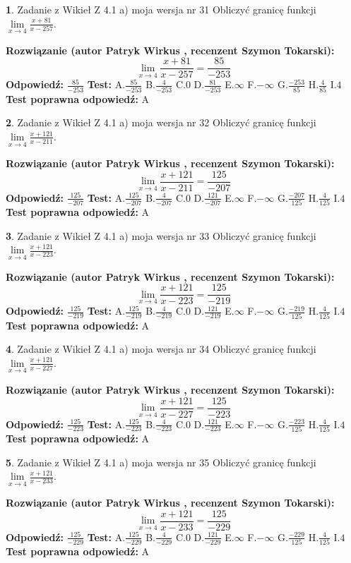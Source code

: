 \documentclass[12pt, a4paper]{article}
\theoremstyle{definition} %
\newtheorem{zad}{}
\newcommand{\zadStart}[1]{\begin{zad}#1\newline}
\newcommand{\zadStop}{\end{zad}}
\newcommand{\rozwStart}[2]{\noindent \textbf{Rozwiązanie (autor #1 , recenzent #2): }\newline}
\newcommand{\rozwStop}{\newline}
\newcommand{\odpStart}{\noindent \textbf{Odpowiedź:}\newline}
\newcommand{\odpStop}{\newline}
\newcommand{\testStart}{\noindent \textbf{Test:}\newline}
\newcommand{\testStop}{\newline}
\newcommand{\kluczStart}{\noindent \textbf{Test poprawna odpowiedź:}\newline}
\newcommand{\kluczStop}{\newline}
\begin{document}
\zadStart{Zadanie z Wikieł Z 4.1 a) moja wersja nr 31}
Obliczyć granicę funkcji $\lim\limits_{x\to4}\frac{x+81}{x-257}$.
\zadStop
\rozwStart{Patryk Wirkus}{Szymon Tokarski}
$$\lim\limits_{x\to4}\frac{x+81}{x-257} = \frac{85}{-253}$$
\rozwStop
\odpStart
$\frac{85}{-253}$
\odpStop
\testStart
A.$\frac{85}{-253}$
B.$\frac{4}{-253}$
C.$0$
D.$\frac{81}{-253}$
E.$\infty$
F.$-\infty$
G.$\frac{-253}{85}$
H.$\frac{4}{85}$
I.$4$
\testStop
\kluczStart
A
\kluczStop



\zadStart{Zadanie z Wikieł Z 4.1 a) moja wersja nr 32}
Obliczyć granicę funkcji $\lim\limits_{x\to4}\frac{x+121}{x-211}$.
\zadStop
\rozwStart{Patryk Wirkus}{Szymon Tokarski}
$$\lim\limits_{x\to4}\frac{x+121}{x-211} = \frac{125}{-207}$$
\rozwStop
\odpStart
$\frac{125}{-207}$
\odpStop
\testStart
A.$\frac{125}{-207}$
B.$\frac{4}{-207}$
C.$0$
D.$\frac{121}{-207}$
E.$\infty$
F.$-\infty$
G.$\frac{-207}{125}$
H.$\frac{4}{125}$
I.$4$
\testStop
\kluczStart
A
\kluczStop



\zadStart{Zadanie z Wikieł Z 4.1 a) moja wersja nr 33}
Obliczyć granicę funkcji $\lim\limits_{x\to4}\frac{x+121}{x-223}$.
\zadStop
\rozwStart{Patryk Wirkus}{Szymon Tokarski}
$$\lim\limits_{x\to4}\frac{x+121}{x-223} = \frac{125}{-219}$$
\rozwStop
\odpStart
$\frac{125}{-219}$
\odpStop
\testStart
A.$\frac{125}{-219}$
B.$\frac{4}{-219}$
C.$0$
D.$\frac{121}{-219}$
E.$\infty$
F.$-\infty$
G.$\frac{-219}{125}$
H.$\frac{4}{125}$
I.$4$
\testStop
\kluczStart
A
\kluczStop



\zadStart{Zadanie z Wikieł Z 4.1 a) moja wersja nr 34}
Obliczyć granicę funkcji $\lim\limits_{x\to4}\frac{x+121}{x-227}$.
\zadStop
\rozwStart{Patryk Wirkus}{Szymon Tokarski}
$$\lim\limits_{x\to4}\frac{x+121}{x-227} = \frac{125}{-223}$$
\rozwStop
\odpStart
$\frac{125}{-223}$
\odpStop
\testStart
A.$\frac{125}{-223}$
B.$\frac{4}{-223}$
C.$0$
D.$\frac{121}{-223}$
E.$\infty$
F.$-\infty$
G.$\frac{-223}{125}$
H.$\frac{4}{125}$
I.$4$
\testStop
\kluczStart
A
\kluczStop



\zadStart{Zadanie z Wikieł Z 4.1 a) moja wersja nr 35}
Obliczyć granicę funkcji $\lim\limits_{x\to4}\frac{x+121}{x-233}$.
\zadStop
\rozwStart{Patryk Wirkus}{Szymon Tokarski}
$$\lim\limits_{x\to4}\frac{x+121}{x-233} = \frac{125}{-229}$$
\rozwStop
\odpStart
$\frac{125}{-229}$
\odpStop
\testStart
A.$\frac{125}{-229}$
B.$\frac{4}{-229}$
C.$0$
D.$\frac{121}{-229}$
E.$\infty$
F.$-\infty$
G.$\frac{-229}{125}$
H.$\frac{4}{125}$
I.$4$
\testStop
\kluczStart
A
\kluczStop
\end{document}
